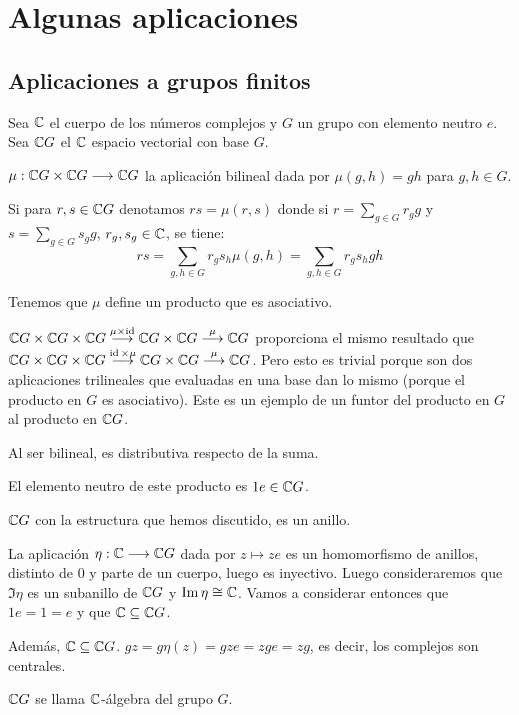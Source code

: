 \section{Algunas aplicaciones}
\subsection{Aplicaciones a grupos finitos}

Sea \(\mathbb{C}\) el cuerpo de los números complejos y \(G\) un grupo con elemento
neutro \(e\). Sea \(\mathbb{C} G\) el \(\mathbb{C}\) espacio vectorial con base \(G\).

\(\mu:\mathbb{C} G\times \mathbb{C} G\longrightarrow \mathbb{C} G\) la aplicación bilineal dada por
\(\mu(g,h)=gh\) para \(g,h\in G\).

Si para \(r,s\in\mathbb{C} G\) denotamos \(rs=\mu(r,s)\) donde si
\(r=\sum_{g\in G} r_g g\) y \(s=\sum_{g\in G} s_g g\), \(r_g, s_g\in\mathbb{C}\),
se tiene:
\[
  rs=\sum_{g,h\in G} r_g s_h\mu(g,h)=\sum_{g,h\in G}r_g s_h gh
\]

Tenemos que \(\mu\) define un producto que es asociativo.

\(\mathbb{C} G\times \mathbb{C} G\times \mathbb{C} G\overset{\mu\times\operatorname{id}}{\longrightarrow} \mathbb{C} G
\times \mathbb{C} G\overset{\mu}{\longrightarrow} \mathbb{C} G\)
proporciona el mismo resultado que
\(\mathbb{C} G\times \mathbb{C} G\times \mathbb{C} G\overset{\operatorname{id}\times\mu}{\longrightarrow} \mathbb{C} G
\times \mathbb{C} G\overset{\mu}{\longrightarrow} \mathbb{C} G\). Pero esto es trivial
porque son dos aplicaciones trilineales que evaluadas en una base dan lo mismo
(porque el producto en \(G\) es asociativo). Este es un ejemplo de un funtor
del producto en \(G\) al producto en \(\mathbb{C} G\).

Al ser bilineal, es distributiva respecto de la suma.

El elemento neutro de este producto es \(1e\in \mathbb{C} G\).

\begin{prop}
  \(\mathbb{C} G\) con la estructura que hemos discutido, es un anillo.
\end{prop}

La aplicación \(\eta:\mathbb{C}\longrightarrow \mathbb{C} G\) dada por \(z\mapsto ze\) es un
homomorfismo de anillos, distinto de 0 y parte de un cuerpo, luego es
inyectivo. Luego consideraremos que \(\Im\eta\) es un subanillo de \(\mathbb{C} G\)
y \(\Im\eta\cong\mathbb{C}\). Vamos a considerar entonces que \(1e=1=e\) y que
\(\mathbb{C}\subseteq\mathbb{C} G\).

Además, \(\mathbb{C}\subseteq\mathbb{C} G\). \(gz=g\eta(z)=gze=zge=zg\), es decir, los
complejos son centrales.

\begin{df}
  \(\mathbb{C} G\) se llama \(\mathbb{C}\)-álgebra del grupo \(G\).
\end{df}

